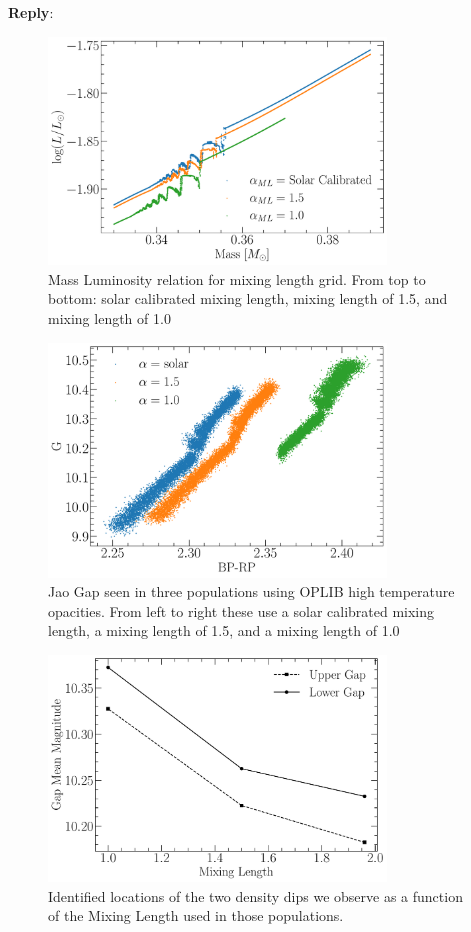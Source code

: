 \documentclass[11pt]{article}
\newenvironment{reply}
   {\medskip \noindent \begin{sf}\textbf{Reply}:\  }
   {\medskip \end{sf}}
\begin{document}
\begin{reply}
	\begin{figure}
		\centering
		\includegraphics[width=0.8\textwidth]{./AlphaMLMassLum.pdf}
		\caption{Mass Luminosity relation for mixing length grid. From top to
		bottom: solar calibrated mixing length, mixing length of 1.5, and
		mixing length of 1.0}
		\label{fig:alphaMLML}
	\end{figure}
	\begin{figure}
		\centering
		\includegraphics[width=0.8\textwidth]{./alphaMLComparisionCMD.pdf}
		\caption{Jao Gap seen in three populations using OPLIB high temperature
		opacities. From left to right these use a solar calibrated mixing length,
		a mixing length of 1.5, and a mixing length of 1.0}
		\label{fig:alphaMLCMD}
	\end{figure}
	\begin{figure}
		\centering
		\includegraphics[width=0.8\textwidth]{./MixingLengthScaling.pdf}
		\caption{Identified locations of the two density dips we observe as a
		function of the Mixing Length used in those populations.}
		\label{fig:alphaMLLoc}
	\end{figure}
\end{reply}
\end{document}
